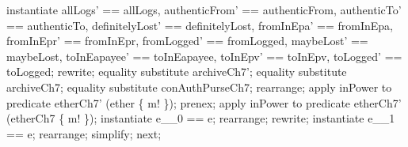 \begin{LPScript}
\begin{zproof}[tBetwConcCReqCorrect]
        instantiate allLogs' == allLogs, authenticFrom' == authenticFrom,
            authenticTo' == authenticTo, definitelyLost' == definitelyLost,
            fromInEpa' == fromInEpa, fromInEpr' == fromInEpr, fromLogged' == fromLogged,
            maybeLost' == maybeLost, toInEapayee' == toInEapayee, toInEpv' == toInEpv,
            toLogged' == toLogged;
        rewrite;
        equality substitute archiveCh7';
        equality substitute archiveCh7;
        equality substitute conAuthPurseCh7;
        rearrange;
        apply inPower to predicate etherCh7' \in \power (ether \cup \{ m! \});
        prenex;
        apply inPower to predicate etherCh7' \in \power (etherCh7 \cup \{ m! \});
        instantiate e\_\_0 == e;
        rearrange;
        rewrite;
        instantiate e\_\_1 == e;
        rearrange;
        simplify;
    next;
\end{zproof}\end{LPScript}


